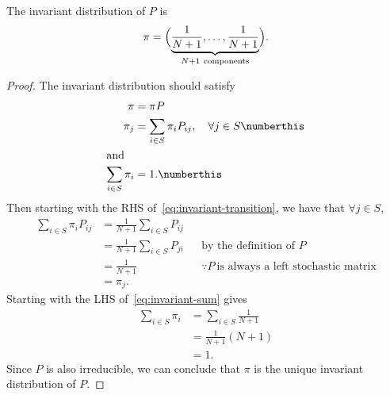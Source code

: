 \documentclass[
  coursecode={MTHE 455},
  assignmentname={Assignment \assignmentnumber},
  studentnumber=20053722,
  name={Bryan Hoang},
  draft,
]{
  ltxanswer%
}
\begin{document}
  \begin{questions}
    \setcounter{question}{\questionnumber}
    \addtocounter{question}{-1}
    \question[6]\
    \begin{parts}
      \part{}
      \begin{solution}
        \begin{claim}
          The invariant distribution of \(P\) is
          \begin{equation*}
            \pi = \Bigl(\underbrace{\frac{1}{N+1},\dotsc,\frac{1}{N+1}}_{N+1\ \text{components}}\Bigr).
          \end{equation*}
        \end{claim}
        \begin{proof}
          The invariant distribution should satisfy
          \begin{align*}
            \pi                    &= \pi P                                                                                          \\
            \pi_{j}                &= \sum_{i \in S} \pi_{i} P_{ij}, \quad \forall j \in S\numberthis\label{eq:invariant-transition} \\
            \intertext{and}
            \sum_{i \in S} \pi_{i} &= 1.\numberthis\label{eq:invariant-sum}
          \end{align*}
          Then starting with the RHS of~\eqref{eq:invariant-transition}, we have that \(\forall j \in S\),
          \begin{align*}
            \sum_{i \in S} \pi_{i} P_{ij} &= \frac{1}{N+1} \sum_{i \in S} P_{ij}                                                          \\
                                          &= \frac{1}{N+1} \sum_{i \in S} P_{ji} & &\text{by the definition of \(P\)}                     \\
                                          &= \frac{1}{N+1}                       & &\because P\ \text{is always a left stochastic matrix} \\
                                          &= \pi_{j}.
          \end{align*}
          Starting with the LHS of~\eqref{eq:invariant-sum} gives
          \begin{align*}
            \sum_{i \in S} \pi_{i} &= \sum_{i \in S} \frac{1}{N+1} \\
                                   &= \frac{1}{N+1} (N+1)          \\
                                   &= 1.
          \end{align*}
          Since \(P\) is also irreducible, we can conclude that \(\pi\) is the unique invariant distribution of \(P\).
        \end{proof}
      \end{solution}


\end{parts}
\end{questions}
\end{document}
